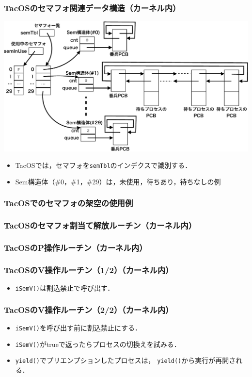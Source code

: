 \documentclass[dvipdfmx]{beamer}
\begin{document}
\begin{frame}
  \frametitle{TacOSのセマフォ関連データ構造（カーネル内）}
  \begin{center}
    \includegraphics[scale=0.45]{Fig/tacosSemaphore-crop.pdf}
  \end{center}
  \begin{itemize}
    \item TacOSでは，セマフォを{\tt semTbl}のインデクスで識別する．
    \item Sem構造体（\#0，\#1，\#29）は，未使用，待ちあり，待ちなしの例
  \end{itemize}
\end{frame}

\begin{frame}
  \frametitle{TacOSでのセマフォの架空の使用例}
  
\end{frame}

\begin{frame}
  \frametitle{TacOSのセマフォ割当て解放ルーチン（カーネル内）}
  
\end{frame}

\begin{frame}
  \frametitle{TacOSのP操作ルーチン（カーネル内）}
  
\end{frame}

\begin{frame}
  \frametitle{TacOSのV操作ルーチン（1/2）（カーネル内）}
  
  \begin{itemize}
  \item {\tt iSemV()}は割込禁止で呼び出す．
  \end{itemize}
\end{frame}

\begin{frame}
  \frametitle{TacOSのV操作ルーチン（2/2）（カーネル内）}
  
  \begin{itemize}
  \item {\tt iSemV()}を呼び出す前に割込禁止にする．
  \item {\tt iSemV()}がtrueで返ったらプロセスの切換えを試みる．
  \item {\tt yield()}でプリエンプションしたプロセスは，
    {\tt yield()}から実行が再開される．
  \end{itemize}
\end{frame}
\end{document}
